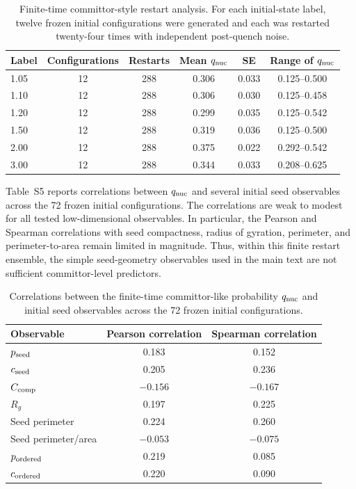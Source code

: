 ﻿\documentclass[aps,pre,preprint,floatfix,amsmath,amssymb,superscriptaddress]{revtex4-2}
\begin{document}
\begin{table}[t]
\centering
\caption{Finite-time committor-style restart analysis. For each initial-state label, twelve frozen initial configurations were generated and each was restarted twenty-four times with independent post-quench noise.}
\label{tab:S4-committor-label}
\begin{tabular}{lccccc}
\hline
Label & Configurations & Restarts & Mean $q_{\rm nuc}$ & SE & Range of $q_{\rm nuc}$ \\
\hline
1.05 & 12 & 288 & 0.306 & 0.033 & 0.125--0.500 \\
1.10 & 12 & 288 & 0.306 & 0.030 & 0.125--0.458 \\
1.20 & 12 & 288 & 0.299 & 0.035 & 0.125--0.542 \\
1.50 & 12 & 288 & 0.319 & 0.036 & 0.125--0.500 \\
2.00 & 12 & 288 & 0.375 & 0.022 & 0.292--0.542 \\
3.00 & 12 & 288 & 0.344 & 0.033 & 0.208--0.625 \\
\hline
\end{tabular}
\end{table}


Table~S5 reports correlations between $q_{\rm nuc}$ and several initial seed observables across the 72 frozen initial configurations. The correlations are weak to modest for all tested low-dimensional observables. In particular, the Pearson and Spearman correlations with seed compactness, radius of gyration, perimeter, and perimeter-to-area remain limited in magnitude. Thus, within this finite restart ensemble, the simple seed-geometry observables used in the main text are not sufficient committor-level predictors.

\begin{table}[t]
\centering
\caption{Correlations between the finite-time committor-like probability $q_{\rm nuc}$ and initial seed observables across the 72 frozen initial configurations.}
\label{tab:S5-committor-correlations}
\begin{tabular}{lcc}
\hline
Observable & Pearson correlation & Spearman correlation \\
\hline
$p_{\rm seed}$ & 0.183 & 0.152 \\
$c_{\rm seed}$ & 0.205 & 0.236 \\
$C_{\rm comp}$ & $-0.156$ & $-0.167$ \\
$R_g$ & 0.197 & 0.225 \\
Seed perimeter & 0.224 & 0.260 \\
Seed perimeter/area & $-0.053$ & $-0.075$ \\
$p_{\rm ordered}$ & 0.219 & 0.085 \\
$c_{\rm ordered}$ & 0.220 & 0.090 \\
\hline
\end{tabular}
\end{table}
\end{document}
